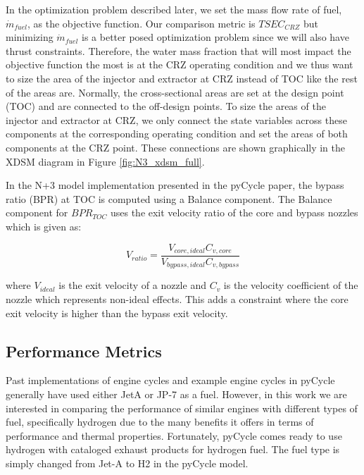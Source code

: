 \documentclass[conf]{new-aiaa}
\begin{document}
In the optimization problem described later, we set the mass flow rate of fuel, $\dot{m}_{fuel}$, as the objective function.
Our comparison metric is $TSEC_{CRZ}$ but minimizing $\dot{m}_{fuel}$ is a better posed optimization problem since we will also have thrust constraints.
Therefore, the water mass fraction that will most impact the objective function the most is at the CRZ operating condition and we thus want to size the area of the injector and extractor at CRZ instead of TOC like the rest of the areas are.
Normally, the cross-sectional areas are set at the design point (TOC) and are connected to the off-design points.
To size the areas of the injector and extractor at CRZ, we only connect the state variables across these components at the corresponding operating condition and set the areas of both components at the CRZ point.
These connections are shown graphically in the XDSM diagram in Figure \ref{fig:N3_xdsm_full}.

In the N+3 model implementation presented in the pyCycle paper, the bypass ratio (BPR) at TOC is computed using a Balance component.
The Balance component for $BPR_{TOC}$ uses the exit velocity ratio of the core and bypass nozzles which is given as:

\begin{equation}
    V_{ratio} = \frac{V_{core,ideal}C_{v,core}}{V_{bypass,ideal}C_{v,bypass}}
\end{equation}

\noindent
where $V_{ideal}$ is the exit velocity of a nozzle and $C_v$ is the velocity coefficient of the nozzle which represents non-ideal effects.
This adds a constraint where the core exit velocity is higher than the bypass exit velocity.

\subsection{Performance Metrics}
Past implementations of engine cycles and example engine cycles in pyCycle generally have used either JetA or JP-7 as a fuel.
However, in this work we are interested in comparing the performance of similar engines with different types of fuel, specifically hydrogen due to the many benefits it offers in terms of performance and thermal properties.
Fortunately, pyCycle comes ready to use hydrogen with cataloged exhaust products for hydrogen fuel.
The fuel type is simply changed from Jet-A to H2 in the pyCycle model.
\end{document}

